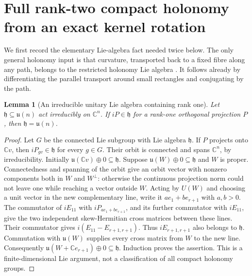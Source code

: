 \documentclass[11pt]{article}
\newtheorem{lemma}[lemma]{Lemma}
\theoremstyle{definition}
\theoremstyle{remark}
\newcommand{\C}{\mathbb C}
\begin{document}
\section{Full rank-two compact holonomy from an exact kernel rotation}
\label{sec:v9-U2}

We first record the elementary Lie-algebra fact needed twice below.
The only general holonomy input is that curvature, transported back to a
fixed fibre along any path, belongs to the restricted holonomy Lie algebra
\cite{AmbroseSinger}. It follows already by differentiating the parallel
transport around small rectangles and conjugating by the path.

\begin{lemma}[An irreducible unitary Lie algebra containing rank one]
\label{lem:v9-rankone-Lie}
Let $\mathfrak h\subseteq\mathfrak u(n)$ act irreducibly on $\C^n$.
If $iP\in\mathfrak h$ for a rank-one orthogonal projection $P$, then
$\mathfrak h=\mathfrak u(n)$.
\end{lemma}
\begin{proof}
Let $G$ be the connected Lie subgroup with Lie algebra $\mathfrak h$.
If $P$ projects onto $\C v$, then $iP_{gv}\in\mathfrak h$ for every
$g\in G$. Their orbit is connected and spans $\C^n$, by irreducibility.
Initially $\mathfrak u(\C v)\oplus0\subseteq\mathfrak h$.
Suppose $\mathfrak u(W)\oplus0\subseteq\mathfrak h$ and $W$ is proper.
Connectedness and spanning of the orbit give an orbit vector with nonzero
components both in $W$ and $W^\perp$: otherwise the continuous projection
norm could not leave one while reaching a vector outside $W$.
Acting by $U(W)$ and choosing a unit vector in the new complementary line,
write it $ae_1+be_{r+1}$ with $a,b>0$.
The commutator of $iE_{11}$ with $iP_{ae_1+be_{r+1}}$, and its further
commutator with $iE_{11}$, give the two independent skew-Hermitian
cross matrices between these lines. Their commutator gives
$i(E_{11}-E_{r+1,r+1})$. Thus $iE_{r+1,r+1}$ also belongs to
$\mathfrak h$. Commutation with $\mathfrak u(W)$ supplies every cross
matrix from $W$ to the new line. Consequently
$\mathfrak u(W+\C e_{r+1})\oplus0\subseteq\mathfrak h$.
Induction proves the assertion. This is a finite-dimensional Lie argument,
not a classification of all compact holonomy groups.
\end{proof}
\end{document}
